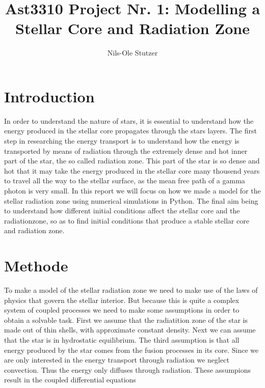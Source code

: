 \documentclass{emulateapj}
\begin{document}
	
	\title{Ast3310 Project Nr. 1: Modelling a Stellar Core and Radiation Zone}
	
	\author{Nils-Ole Stutzer}
	
	
	\section*{Introduction}
	In order to understand the nature of stars, it is essential to understand how the energy produced in the stellar core propagates through the stars layers. The first step in researching the energy transport is to understand how the energy is transported by means of radiation through the extremely dense and hot inner part of the star, the so called radiation zone. This part of the star is so dense and hot that it may take the energy produced in the stellar core many thousend years to travel all the way to the stellar surface, as the mean free path of a gamma photon is very small.
	In this report we will focus on how we made a model for the stellar radiation zone using numerical simulations in Python. The final aim being to understand how different initial conditions affect the stellar core and the radiationzone, so as to find initial conditions that produce a stable stellar core and radiation zone.
	
	\section*{Methode}
	To make a model of the stellar radiation zone we need to make use of the laws of physics that govern the stellar interior. But because this is quite a complex system of coupled processes we need to make some assumptions in order to obtain a solvable task. First we assume that the radiatition zone of the star is made out of thin shells, with approximate constant density. Next we can assume that the star is in hydrostatic equilibrium. The third assumption is that all energy produced by the star comes from the fusion processes in its core. Since we are only interested in the energy transport through radiation we neglect convection. Thus the energy only diffuses through radiation. These assumpions result in the coupled differential equations
	
\end{document}
